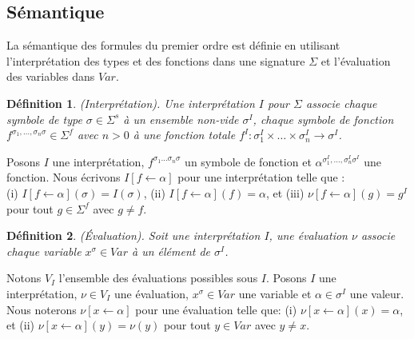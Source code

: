 \documentclass[11pt,openany]{article}
\newtheorem{definition}{D\'efinition}[subsection]
\begin{document}
	\subsection{S\'emantique}
		La s\'emantique des formules du premier ordre est d\'efinie en utilisant l'interpr\'etation des types et des fonctions dans une signature $\Sigma$ et l'\'evaluation des variables dans $Var$.
\begin{definition}
(Interpr\'etation). Une interpr\'etation $I$ pour $\Sigma$ associe chaque symbole de type $\sigma \in \Sigma^{s}$ \`a un ensemble non-vide $\sigma^{I}$, chaque symbole de fonction $f^{\sigma_{1},\ldots,\sigma_{n}\sigma} \in \Sigma^{f}$ avec $n > 0$ \`a une fonction totale $f^{I} : \sigma_{1}^{I}\times \ldots \times \sigma_{n}^{I}\rightarrow\sigma^I$.
\end{definition}
	Posons $I$ une interpr\'etation, $f^{\sigma_{1} \ldots\sigma_{n} \sigma}$ un symbole de fonction et $\alpha^{\sigma_{1}^{I},\ldots,\sigma_{n}^{I}\sigma^{I}}$ une fonction. Nous \'ecrivons $I[f \leftarrow \alpha]$ pour une interpr\'etation telle que : \\(i) $I[f\leftarrow\alpha](\sigma) = I(\sigma)$, (ii) $I[f\leftarrow\alpha](f) = \alpha$, et (iii) $\nu[f\leftarrow\alpha](g) = g^{I}$ pour tout $g \in \Sigma^{f}$ avec $g\neq f$.
	
\begin{definition}
(\'Evaluation). Soit une interpr\'etation $I$, une \'evaluation $\nu$ associe chaque variable $x^{\sigma} \in Var$ \`a un \'el\'ement de $\sigma^{I}$.
\end{definition}
Notons $V_{I}$ l'ensemble des \'evaluations possibles sous $I$.
Posons $I$ une interpr\'etation, $\nu \in V_{I}$ une \'evaluation, $x^{\sigma} \in Var$ une variable et $\alpha \in \sigma^{I}$ une valeur. Nous noterons $\nu[x\leftarrow\alpha]$ pour une \'evaluation telle que: (i) $\nu[x\leftarrow\alpha](x) = \alpha$, et (ii) $\nu[x\leftarrow\alpha](y)=\nu(y)$ pour tout $y\in Var$ avec $y\neq x$.
\end{document}
